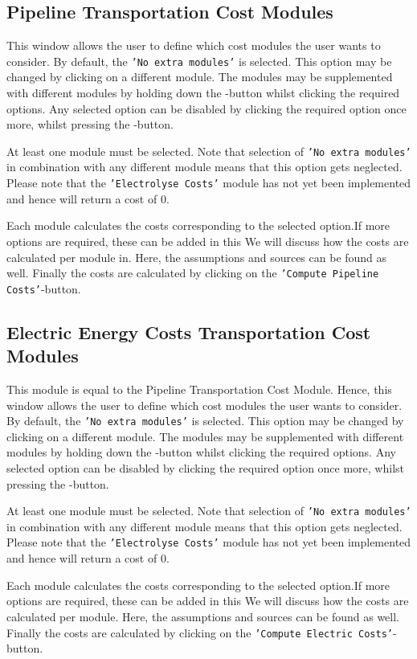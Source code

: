 \documentclass{article}
\begin{document}
\subsection{Pipeline Transportation Cost Modules}
This window allows the user to define which cost modules the user wants to consider. By default, the \texttt{'No extra modules'} is selected. This option may be changed by clicking on a different module. The modules may be supplemented with different modules by holding down the -button whilst clicking the required options. Any selected option can be disabled by clicking the required option once more, whilst pressing the -button. 
\begin{warn}
At least one module must be selected. Note that selection of \texttt{'No extra modules'} in combination with any different module means that this option gets neglected. Please note that the \texttt{'Electrolyse Costs'} module has not yet been implemented and hence will return a cost of $0$.
\end{warn}
Each module calculates the costs corresponding to the selected option.If more options are required, these can be added in this  We will discuss how the costs are calculated per module in. Here, the assumptions and sources can be found as well. Finally the costs are calculated by clicking on the \texttt{'Compute Pipeline Costs'}-button.

\subsection{Electric Energy Costs Transportation Cost Modules}
This module is equal to the Pipeline Transportation Cost Module. Hence, this window allows the user to define which cost modules the user wants to consider.  By default, the \texttt{'No extra modules'} is selected. This option may be changed by clicking on a different module. The modules may be supplemented with different modules by holding down the -button whilst clicking the required options. Any selected option can be disabled by clicking the required option once more, whilst pressing the -button. 
\begin{warn}
At least one module must be selected. Note that selection of \texttt{'No extra modules'} in combination with any different module means that this option gets neglected. Please note that the \texttt{'Electrolyse Costs'} module has not yet been implemented and hence will return a cost of $0$.
\end{warn}
Each module calculates the costs corresponding to the selected option.If more options are required, these can be added in this  We will discuss how the costs are calculated per module. Here, the assumptions and sources can be found as well.  Finally the costs are calculated by clicking on the \texttt{'Compute Electric Costs'}-button.
\end{document}
